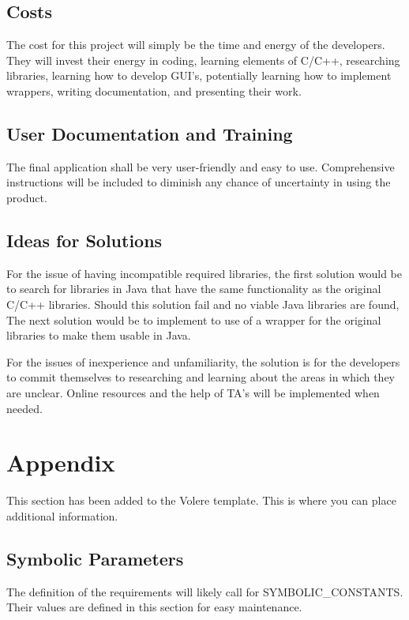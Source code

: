 \documentclass[12pt, titlepage]{article}
\begin{document}
\subsection{Costs}
\indent \indent The cost for this project will simply be the time and energy of the developers. They will invest their energy in coding, learning elements of C/C++, researching libraries, learning how to develop GUI's, potentially learning how to implement wrappers, writing documentation, and presenting their work.

\subsection{User Documentation and Training}
\indent \indent The final application shall be very user-friendly and easy to use. Comprehensive instructions will be included to diminish any chance of uncertainty in using the product.

\subsection{Ideas for Solutions}
\indent \indent For the issue of having incompatible required libraries, the first solution would be to search for libraries in Java that have the same functionality as the original C/C++ libraries. Should this solution fail and no viable Java libraries are found, The next solution would be to implement to use of a wrapper for the original libraries to make them usable in Java.

\indent For the issues of inexperience and unfamiliarity, the solution is for the developers to commit themselves to researching and learning about the areas in which they are unclear. Online resources and the help of TA's will be implemented when needed.





\newpage

\section{Appendix}

This section has been added to the Volere template.  This is where you can place
additional information.

\subsection{Symbolic Parameters}

The definition of the requirements will likely call for SYMBOLIC\_CONSTANTS.
Their values are defined in this section for easy maintenance.
\end{document}
